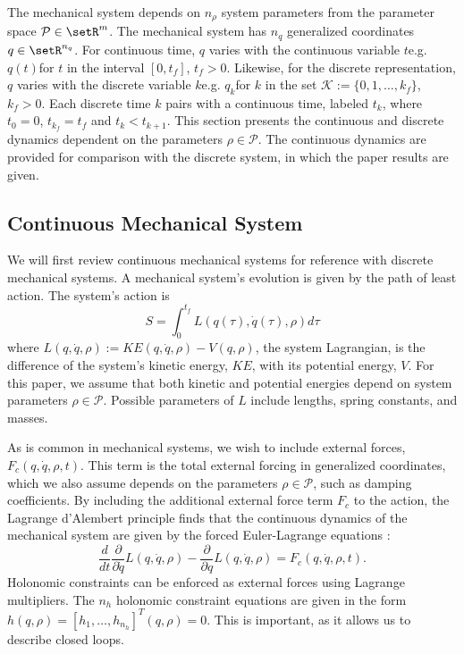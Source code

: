 \documentclass[letterpaper, 10pt, conference]{ieeeconf}
\begin{document}
The mechanical system depends on $n_\rho$ system parameters from the parameter space $\mathcal{P}\in\setR^m$. The mechanical system has $n_q$ generalized coordinates $q\in\setR^{n_q}$.  For continuous time, $q$ varies with the continuous variable $t$\textemdash e.g. $q(t)$\textemdash for $t$ in the interval $[0,t_f]$, $t_f>0$.  Likewise, for the discrete representation, $q$ varies with the discrete variable $k$\textemdash e.g. $q_k$\textemdash for $k$ in the set $\mathcal{K}:=\{0,1,\ldots,k_f\}$, $k_f>0$.  Each discrete time $k$ pairs with a continuous time, labeled $t_k$, where $t_0 = 0$, $t_{k_f} = t_f$ and $t_k<t_{k+1}$. This section presents the continuous and discrete dynamics dependent on the parameters $\rho\in\mathcal{P}$.  The continuous dynamics are provided for comparison with the discrete system, in which the paper results are given.

\subsection{Continuous Mechanical System}
We will first review continuous mechanical systems for reference with discrete mechanical systems.  A mechanical system's evolution is given by the path of least action.  The system's action is 
\[
S = \int_0^{t_f}L(q(\tau),\dot{q}(\tau),\rho)d\tau
\]
where $L(q,\dot{q},\rho) := KE(q,\dot{q},\rho) - V(q,\rho)$, the system Lagrangian, is the difference of the system's kinetic energy, $KE$, with its potential energy, $V$.  For this paper, we assume that both kinetic and potential energies depend on system parameters $\rho\in\mathcal{P}$.  Possible parameters of $L$ include lengths, spring constants, and masses. 

As is common in mechanical systems, we wish to include external forces, $F_c(q,\dot{q},\rho,t)$.  This term is the total external forcing in generalized coordinates, which we also assume depends on the parameters $\rho\in\mathcal{P}$, such as damping coefficients.  By including the additional external force term $F_c$ to the action, the Lagrange d'Alembert principle finds that the continuous dynamics of the mechanical system are given by the forced Euler-Lagrange equations \cite{murray_li_sastry}:
\[
\frac{d}{d t}\frac{\partial}{\partial \dot{q}}L(q,\dot{q},\rho) - \frac{\partial}{\partial q}L(q,\dot{q},\rho) = F_c(q,\dot{q},\rho,t).
\]
Holonomic constraints can be enforced as external forces using Lagrange multipliers.  The $n_h$ holonomic constraint equations are given in the form $h(q,\rho)= [h_1,\ldots,h_{n_h}]^T(q,\rho) = 0$. This is important, as it allows us to describe closed loops. 
\end{document}
